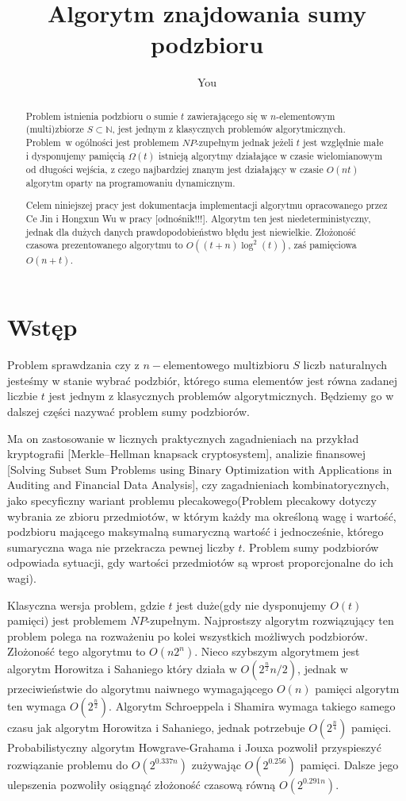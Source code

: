\documentclass{article}
\title{Algorytm znajdowania sumy podzbioru}
\author{You}
\begin{document}
\maketitle

\begin{abstract}
Problem istnienia podzbioru o sumie $t$ zawierającego się w $n$-elementowym (multi)zbiorze $S \subset \mathbb{N}$, 
jest jednym z klasycznych problemów algorytmicznych. Problem w ogólności jest problemem $NP$-zupełnym
jednak jeżeli $t$ jest względnie małe i dysponujemy pamięcią $\Omega(t)$ istnieją algorytmy działające 
w czasie wielomianowym od długości wejścia, z czego najbardziej znanym jest działający w czasie $O(nt)$
algorytm oparty na programowaniu dynamicznym.

Celem niniejszej pracy jest dokumentacja implementacji
algorytmu opracowanego przez Ce Jin i Hongxun Wu w pracy [odnośnik!!!]. Algorytm ten jest niedeterministyczny,
jednak dla dużych danych prawdopodobieństwo błędu jest niewielkie. Złożoność czasowa prezentowanego
algorytmu to $O((t+n)\log^2(t))$, zaś pamięciowa $O(n+t)$.

\end{abstract}

\section{Wstęp}
Problem sprawdzania czy z $n-$elementowego multizbioru $S$ liczb naturalnych jesteśmy w stanie wybrać 
podzbiór, którego suma elementów jest równa zadanej liczbie $t$ jest jednym z klasycznych problemów 
algorytmicznych. Będziemy go w dalszej części nazywać problem sumy podzbiorów. 

Ma on zastosowanie w licznych praktycznych zagadnieniach na przykład kryptografii
[Merkle–Hellman knapsack cryptosystem], analizie finansowej 
[Solving Subset Sum Problems using Binary Optimization with 
Applications in Auditing and Financial Data Analysis], czy zagadnieniach kombinatorycznych, jako specyficzny
wariant problemu plecakowego(Problem plecakowy dotyczy wybrania ze zbioru przedmiotów, w którym każdy ma 
określoną wagę i wartość, podzbioru mającego maksymalną sumaryczną wartość i jednocześnie, którego 
sumaryczna waga nie przekracza pewnej liczby $t$. Problem sumy podzbiorów odpowiada sytuacji, 
gdy wartości przedmiotów są wprost proporcjonalne do ich wagi). 

Klasyczna wersja problem, gdzie $t$ jest duże(gdy nie dysponujemy $O(t)$ pamięci) jest problemem 
$NP$-zupełnym. Najprostszy algorytm rozwiązujący ten problem polega na rozważeniu po kolei wszystkich 
możliwych podzbiorów. Złożoność tego algorytmu to $O(n2^n)$. Nieco szybszym algorytmem jest algorytm Horowitza
i Sahaniego który działa w $O(2^{\frac{n}{2}}n/2)$, jednak w przeciwieństwie do algorytmu naiwnego wymagającego
$O(n)$ pamięci algorytm ten wymaga $O(2^{\frac{n}{2}})$. Algorytm Schroeppela i Shamira wymaga takiego samego
czasu jak algorytm Horowitza i Sahaniego, jednak potrzebuje $O(2^{\frac{n}{4}})$ pamięci. Probabilistyczny 
algorytm Howgrave-Grahama i Jouxa pozwolił przyspieszyć rozwiązanie problemu do $O(2^{0.337n})$
zużywając $O(2^{0.256})$ pamięci. Dalsze jego ulepszenia pozwoliły osiągnąć złożoność czasową równą 
$O(2^{0.291n})$.
\end{document}
